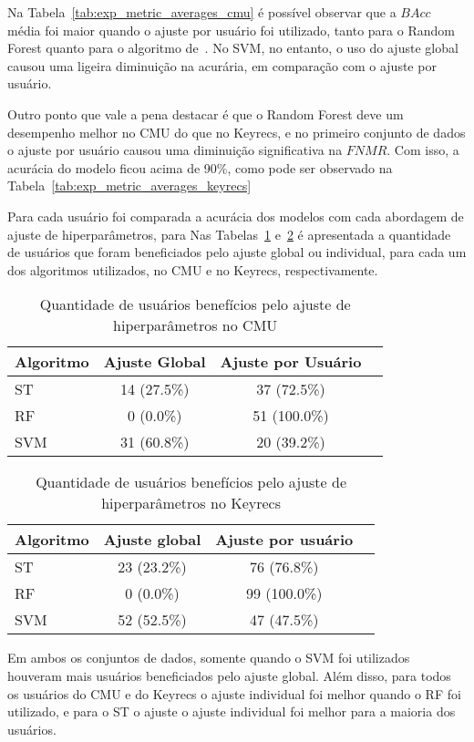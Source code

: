 Na Tabela~\ref{tab:exp_metric_averages_cmu} é possível observar que a $BAcc$ média foi maior quando o ajuste por usuário foi utilizado, tanto para o Random Forest quanto para o algoritmo de~. No SVM, no entanto, o uso do ajuste global causou uma ligeira diminuição na acurária, em comparação com o ajuste por usuário.

Outro ponto que vale a pena destacar é que o Random Forest deve um desempenho melhor no CMU do que no Keyrecs, e no primeiro conjunto de dados o ajuste por usuário causou uma diminuição significativa na $FNMR$. Com isso, a acurácia do modelo ficou acima de 90\%, como pode ser observado na Tabela~\ref{tab:exp_metric_averages_keyrecs}

Para cada usuário foi comparada a acurácia dos modelos com cada abordagem de ajuste de hiperparâmetros, para  Nas Tabelas~\ref{tab:cmu_hp_comparison} e~\ref{tab:keyrecs_hp_comparison} é apresentada a quantidade de usuários que foram beneficiados pelo ajuste global ou individual, para cada um dos algoritmos utilizados, no CMU e no Keyrecs, respectivamente. 

\begin{table}[htbp]
\centering
\caption{Quantidade de usuários benefícios pelo ajuste de hiperparâmetros no CMU}
\label{tab:cmu_hp_comparison}
\begin{tabular}{|l|c|c|c|}
\hline
\textbf{Algoritmo} & \textbf{Ajuste Global} & \textbf{Ajuste por Usuário} \\
\hline
ST & 14 (27.5\%) & 37 (72.5\%) \\
\hline
RF & 0 (0.0\%) & 51 (100.0\%) \\
\hline
SVM & 31 (60.8\%) & 20 (39.2\%) \\
\hline
\end{tabular}
\end{table}

\begin{table}[htbp]
\centering
\caption{Quantidade de usuários benefícios pelo ajuste de hiperparâmetros no Keyrecs}
\label{tab:keyrecs_hp_comparison}
\begin{tabular}{|l|c|c|c|}
\hline
\textbf{Algoritmo} & \textbf{Ajuste global} & \textbf{Ajuste por usuário} \\
\hline
ST & 23 (23.2\%) & 76 (76.8\%) \\
\hline
RF & 0 (0.0\%) & 99 (100.0\%) \\
\hline
SVM & 52 (52.5\%) & 47 (47.5\%) \\
\hline
\end{tabular}
\end{table}

Em ambos os conjuntos de dados, somente quando o SVM foi utilizados houveram mais usuários beneficiados pelo ajuste global. Além disso, para todos os usuários do CMU e do Keyrecs o ajuste individual foi melhor quando o RF foi utilizado, e para o ST o ajuste o ajuste individual foi melhor para a maioria dos usuários.